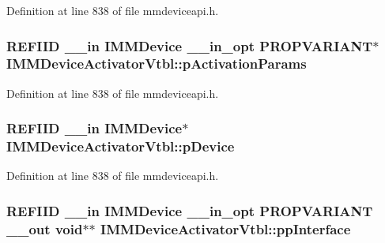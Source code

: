 Definition at line 838 of file mmdeviceapi.\+h.

\subsubsection[{\texorpdfstring{p\+Activation\+Params}{pActivationParams}}]{ {\bf R\+E\+F\+I\+ID} {\bf \+\_\+\+\_\+in} {\bf I\+M\+M\+Device} {\bf \+\_\+\+\_\+in\+\_\+opt} {\bf P\+R\+O\+P\+V\+A\+R\+I\+A\+NT}$\ast$ I\+M\+M\+Device\+Activator\+Vtbl\+::p\+Activation\+Params}\hypertarget{struct_i_m_m_device_activator_vtbl_a1b445fc6c6ef36aa6d00715032049680}{}\label{struct_i_m_m_device_activator_vtbl_a1b445fc6c6ef36aa6d00715032049680}


Definition at line 838 of file mmdeviceapi.\+h.

\subsubsection[{\texorpdfstring{p\+Device}{pDevice}}]{ {\bf R\+E\+F\+I\+ID} {\bf \+\_\+\+\_\+in} {\bf I\+M\+M\+Device}$\ast$ I\+M\+M\+Device\+Activator\+Vtbl\+::p\+Device}\hypertarget{struct_i_m_m_device_activator_vtbl_a3a38d77578fef9f47945ef9f19bb95ec}{}\label{struct_i_m_m_device_activator_vtbl_a3a38d77578fef9f47945ef9f19bb95ec}


Definition at line 838 of file mmdeviceapi.\+h.

\subsubsection[{\texorpdfstring{pp\+Interface}{ppInterface}}]{ {\bf R\+E\+F\+I\+ID} {\bf \+\_\+\+\_\+in} {\bf I\+M\+M\+Device} {\bf \+\_\+\+\_\+in\+\_\+opt} {\bf P\+R\+O\+P\+V\+A\+R\+I\+A\+NT} {\bf \+\_\+\+\_\+out} {\bf void}$\ast$$\ast$ I\+M\+M\+Device\+Activator\+Vtbl\+::pp\+Interface}\hypertarget{struct_i_m_m_device_activator_vtbl_a6777edf1a6a671834b69f21b47978aaf}{}\label{struct_i_m_m_device_activator_vtbl_a6777edf1a6a671834b69f21b47978aaf}


